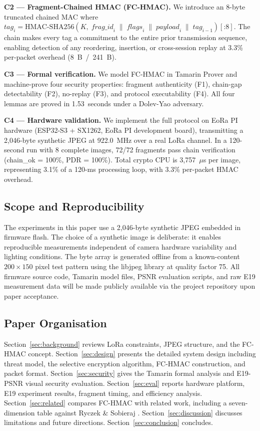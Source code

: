 \documentclass[journal]{IEEEtran}
\begin{document}
\textbf{C2 --- Fragment-Chained HMAC (FC-HMAC).}
We introduce an 8-byte truncated chained MAC where
$\mathit{tag}_i = \allowbreak \mathrm{HMAC\text{-}SHA256}(K,\;
 \mathit{frag\_id}_i \;\|\; \mathit{flags}_i \;\|\;
 \mathit{payload}_i \;\|\; \mathit{tag}_{i-1})[\text{:}8]$.
The chain makes every tag a commitment to the entire prior transmission
sequence, enabling detection of any reordering, insertion, or cross-session
replay at 3.3\% per-packet overhead (8~B~/~241~B).

\textbf{C3 --- Formal verification.}
We model FC-HMAC in Tamarin Prover \cite{tamarin_prover} and machine-prove
four security properties: fragment authenticity (F1), chain-gap detectability
(F2), no-replay (F3), and protocol executability (F4).  All four lemmas are
proved in 1.53~seconds under a Dolev-Yao adversary.

\textbf{C4 --- Hardware validation.}
We implement the full protocol on EoRa PI hardware (ESP32-S3 + SX1262,
EoRa PI development board), transmitting a 2{,}046-byte synthetic JPEG at
922.0~MHz over a real LoRa channel.  In a 120-second run with 8 complete
images, 72/72 fragments pass chain verification (chain\_ok = 100\%,
PDR = 100\%).  Total crypto CPU is 3{,}757~$\mu$s per image, representing
3.1\% of a 120-ms processing loop, with 3.3\% per-packet HMAC overhead.

\subsection*{Scope and Reproducibility}

The experiments in this paper use a 2{,}046-byte synthetic JPEG embedded in
firmware flash.  The choice of a synthetic image is deliberate: it enables
reproducible measurements independent of camera hardware variability and
lighting conditions.  The byte array is generated offline from a known-content
$200\times150$ pixel test pattern using the libjpeg library at quality factor
75.  All firmware source code, Tamarin model files, PSNR evaluation scripts,
and raw E19 measurement data will be made publicly available via the project
repository upon paper acceptance.

\subsection*{Paper Organisation}

Section~\ref{sec:background} reviews LoRa constraints, JPEG structure, and the
FC-HMAC concept.
Section~\ref{sec:design} presents the detailed system design including threat
model, the selective encryption algorithm, FC-HMAC construction, and packet
format.
Section~\ref{sec:security} gives the Tamarin formal analysis and E19-PSNR
visual security evaluation.
Section~\ref{sec:eval} reports hardware platform, E19 experiment results,
fragment timing, and efficiency analysis.
Section~\ref{sec:related} compares FC-HMAC with related work, including a
seven-dimension table against Ryczek \& Sobieraj \cite{ryczek2025}.
Section~\ref{sec:discussion} discusses limitations and future directions.
Section~\ref{sec:conclusion} concludes.
\end{document}
